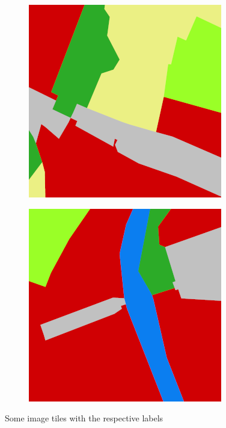 \begin{figure}
\begin{subfigure}{\DopLabelImageWidth}
    \end{subfigure}
    \hfill
    \begin{subfigure}{\DopLabelImageWidth}
        \includegraphics[width=\textwidth]{images/2281_label}
    \end{subfigure}
    \hfill
    \begin{subfigure}{\DopLabelImageWidth}
        \includegraphics[width=\textwidth]{images/3589_label}
    \end{subfigure}
    \hfill

    \caption{Some image tiles with the respective labels}
    \label{fig:dop_with_labels}
\end{figure}

